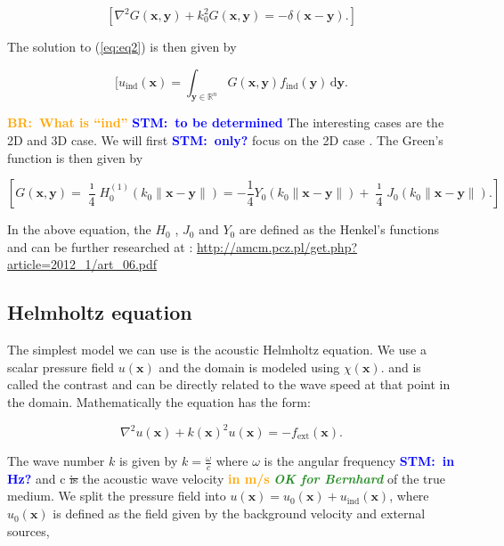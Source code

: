 \documentclass[10pt,a4paper]{article}
\newcommand{\df}[1]{\, \ensuremath{\mbox{d}#1}}
\newcommand{\commentstm}[1]{\textcolor{blue}{\textbf{STM:\ #1}}}
\newcommand{\newstmtwo}[1]{\textcolor{orange}{\textbf{#1}}}
\newcommand{\oldstm}[1]{\sout{#1}}
\newcommand{\brok}{\textcolor{ForestGreen}{\textit{\textbf{OK for Bernhard}}}}
\newcommand{\commentbr}[1]{\textcolor{orange}{\textbf{BR:\ #1}}}
\begin{document}
\begin{equation} \label{eq:eq2}
[ \nabla^2 G(\mathbf{x}, \mathbf{y}) + k_0^2 G(\mathbf{x}, \mathbf{y}) = -\delta(\mathbf{x} - \mathbf{y}). ]\end{equation}

The solution to (\ref{eq:eq2}) is then given by

\begin{equation} \label{eq:eq3}[ u_\text{ind}(\mathbf{x}) = \int_{\mathbf{y} \in \mathbb{R}^n} G(\mathbf{x}, \mathbf{y}) f_\text{ind}(\mathbf{y}) \df{\mathbf{y}}.\end{equation}

\commentbr{What is ``ind''}
\commentstm{to be determined}
The interesting cases are the 2D and 3D case. We will first \commentstm{only?} focus on the 2D case . The Green's function is then given by

\begin{equation} \label{eq:eq4}[ G(\mathbf{x}, \mathbf{y}) = \frac{\imath}{4} H_0^{(1)}(k_0 \|\mathbf{x} - \mathbf{y}\|) = -\frac{1}{4} Y_0(k_0 \|\mathbf{x} - \mathbf{y}\|) + \frac{\imath}{4} J_0(k_0 \|\mathbf{x} - \mathbf{y}\|).  ]\end{equation}

In the above equation, the $H_0$ , $J_0$ and $Y_0$ are defined as the Henkel's functions and can be further researched at : \url{http://amcm.pcz.pl/get.php?article=2012_1/art_06.pdf}

\subsection{Helmholtz equation}

The simplest model we can use is the acoustic Helmholtz equation. We use a scalar pressure field $u(\mathbf{x})$ and the domain is modeled using $\chi(\mathbf{x})$. and is called the contrast and can be directly related to the wave speed at that point in the domain. Mathematically the equation has the form:

\begin{equation} \label{eq:eq5}
\nabla^2 u(\mathbf{x}) + k(\mathbf{x})^2 u(\mathbf{x}) = -f_{\text{ext}}(\mathbf{x}).
\end{equation}

The wave number $k$ is given by $k = \frac{\omega}{c}$ where $\omega$ is the angular frequency \commentstm{in Hz?}  and c \oldstm{is} the acoustic wave velocity \newstmtwo{in m/s} {\brok} of the true medium.  We split the pressure field into $u(\mathbf{x}) = u_0(\mathbf{x}) + u_{\text{ind}}(\mathbf{x})$, where $u_0(\mathbf{x})$ is defined as the field given by the background velocity and external sources,
\end{document}
